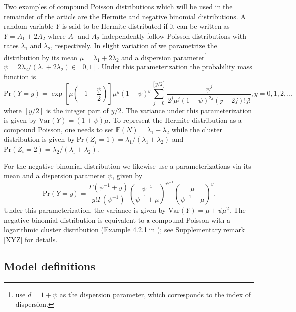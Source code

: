 \documentclass{article}
\begin{document}
Two examples of compound Poisson distributions which will be used in the remainder of the article are the Hermite and negative binomial distributions. A random variable $Y$ is said to be Hermite distributed if it can be written as $Y = A_1 + 2A_2$ where $A_1$ and $A_2$ independently follow Poisson distributions with rates $\lambda_1$ and $\lambda_2$, respectively. In slight variation of \cite{Gupta1974} we parametrize the distribution by its mean $\mu = \lambda_1 + 2\lambda_2$ and a dispersion parameter\footnote{\cite{Gupta1974} use $d = 1 + \psi$ as the dispersion parameter, which corresponds to the index of dispersion.} $\psi = 2\lambda_2/(\lambda_1 + 2\lambda_2) \in [0, 1]$. Under this parameterization the probability mass function is
$$
\text{Pr}(Y = y) = \exp\left[\mu\left(-1 + \frac{\psi}{2}\right)\right] \mu^y(1 - \psi)^y \sum_{j = 0}^{[y/2]} \frac{\psi^j}{2^j\mu^j(1 - \psi)^{2j}(y - 2j)!j!}, y = 0, 1, 2, \dots
$$
where $[y/2]$ is the integer part of $y/2$. The variance under this parameterization is given by $\text{Var}(Y) = (1 + \psi)\mu$. To represent the Hermite distribution as a compound Poisson, one needs to set $\mathbb{E}(N) = \lambda_1 + \lambda_2$ while the cluster distribution is given by $\text{Pr}(Z_i = 1) = \lambda_1/(\lambda_1 + \lambda_2)$ and $\text{Pr}(Z_i = 2) = \lambda_2/(\lambda_1 + \lambda_2)$.

For the negative binomial distribution we likewise use a parameterizations via its mean and a dispersion parameter $\psi$, given by
$$
\text{Pr}(Y = y) = \frac{\Gamma(\psi^{-1} + y)}{y!\Gamma(\psi^{-1})} \left(\frac{\psi^{-1}}{\psi^{-1} + \mu}\right)^{\psi^{-1}} \left(\frac{\mu}{\psi^{-1} + \mu}\right)^y.
$$
Under this parameterization, the variance is given by $\text{Var}(Y) = \mu + \psi\mu^2$. The negative binomial distribution is equivalent to a compound Poisson with a logarithmic cluster distribution (Example 4.2.1 in \cite{Weiss2018}); see Supplementary remark \ref{XYZ} for details. %

\subsection{Model definitions}
\end{document}

